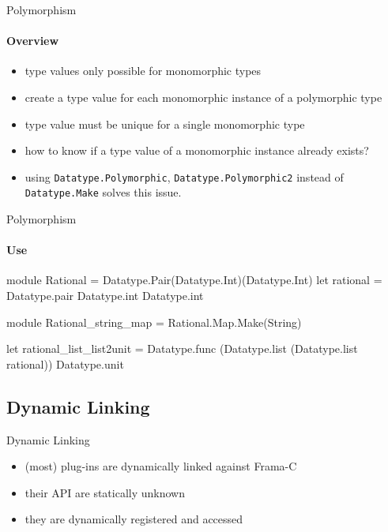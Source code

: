 \begin{frame}{Polymorphism}
  \framesubtitle{Overview}

\begin{itemize}
\item type values only possible for monomorphic types
\item create a type value for each monomorphic instance of a polymorphic type
\item type value must be unique for a single monomorphic type
\item how to know if a type value of a monomorphic instance already exists?
\item using \texttt{Datatype.Polymorphic}, \texttt{Datatype.Polymorphic2}
  instead of \texttt{Datatype.Make} solves this issue.
\end{itemize}

\end{frame}

\begin{frame}[fragile]{Polymorphism}
  \framesubtitle{Use}
\begin{ocamlcode}
module Rational = 
  Datatype.Pair(Datatype.Int)(Datatype.Int)
let rational = 
  Datatype.pair Datatype.int Datatype.int

module Rational_string_map = 
  Rational.Map.Make(String)

let rational_list_list2unit = 
  Datatype.func
    (Datatype.list (Datatype.list rational))
    Datatype.unit
\end{ocamlcode}
\end{frame}


\subsection{Dynamic Linking}

\begin{frame}{Dynamic Linking}

\begin{itemize}
\item (most) plug-ins are dynamically linked against Frama-C
\item their API are statically unknown
\item they are dynamically registered and accessed
\end{itemize}

\end{frame}

